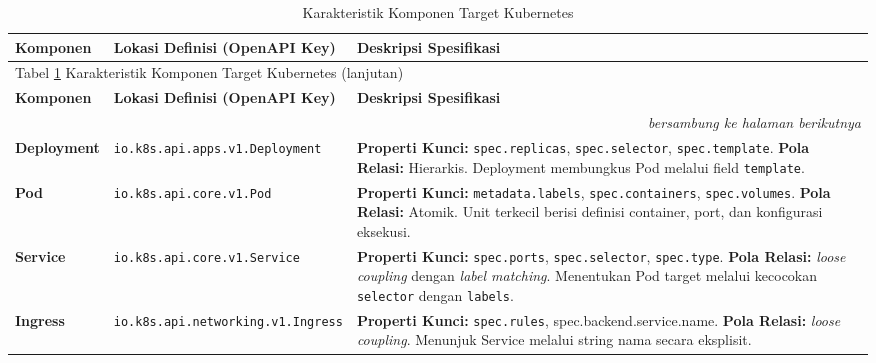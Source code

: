 \captionsetup[longtable]{justification=raggedright,singlelinecheck=false}

\begin{longtable}{ | p{} | p{} | p{} |}
\caption{Karakteristik Komponen Target Kubernetes}
\label{tbl:target_components_new} \\
\hline
\textbf{Komponen} & \textbf{Lokasi Definisi (OpenAPI Key)} & \textbf{Deskripsi Spesifikasi} \\
\hline
\endfirsthead

\multicolumn{3}{l}{Tabel \ref{tbl:target_components_new} Karakteristik Komponen Target Kubernetes (lanjutan)} \\
\hline
\textbf{Komponen} & \textbf{Lokasi Definisi (OpenAPI Key)} & \textbf{Deskripsi Spesifikasi} \\
\hline
\endhead


\hline
\multicolumn{3}{r}{\textit{bersambung ke halaman berikutnya}} \\
\endfoot

\hline
\endlastfoot

\textbf{Deployment} & 
\texttt{io.k8s.api.apps.v1.Deployment} &
\textbf{Properti Kunci:} \texttt{spec.replicas}, \texttt{spec.selector}, \texttt{spec.template}. 
\newline
\textbf{Pola Relasi:} Hierarkis. Deployment membungkus Pod melalui field \texttt{template}. \\
\hline

\textbf{Pod} &
\texttt{io.k8s.api.core.v1.Pod} &
\textbf{Properti Kunci:} \texttt{metadata.labels}, \texttt{spec.containers}, \texttt{spec.volumes}. 
\newline
\textbf{Pola Relasi:} Atomik. Unit terkecil berisi definisi container, port, dan konfigurasi eksekusi. \\
\hline

\textbf{Service} &
\texttt{io.k8s.api.core.v1.Service} &
\textbf{Properti Kunci:} \texttt{spec.ports}, \texttt{spec.selector}, \texttt{spec.type}. 
\newline
\textbf{Pola Relasi:} \textit{loose coupling} dengan \textit{label matching}. Menentukan Pod target melalui kecocokan \texttt{selector} dengan \texttt{labels}. \\
\hline

\textbf{Ingress} &
\texttt{io.k8s.api.networking.v1.Ingress} &
\textbf{Properti Kunci:} \texttt{spec.rules}, spec.backend.service.name.
\newline
\textbf{Pola Relasi:} \textit{loose coupling}. Menunjuk Service melalui string nama secara eksplisit. \\
\hline


\end{longtable}
